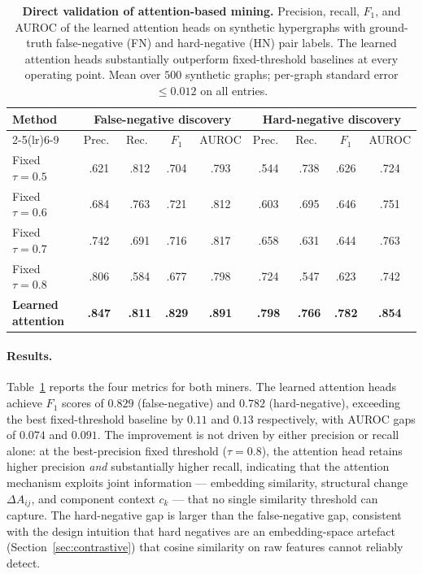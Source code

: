 \documentclass[10pt]{article}
\theoremstyle{plain}
\theoremstyle{definition}
\begin{document}
\begin{table}[ht!]
\centering
\caption{\textbf{Direct validation of attention-based mining.} Precision, recall, $F_{1}$, and AUROC of the learned attention heads on synthetic hypergraphs with ground-truth false-negative (FN) and hard-negative (HN) pair labels. The learned attention heads substantially outperform fixed-threshold baselines at every operating point. Mean over $500$ synthetic graphs; per-graph standard error $\leq\!0.012$ on all entries.}
\label{tab:attn_validation}
\setlength{\tabcolsep}{5pt}
\renewcommand{\arraystretch}{1.1}
\small
\begin{tabular}{l cccc cccc}
\toprule
\multirow{2}{*}{\textbf{Method}}
& \multicolumn{4}{c}{\textbf{False-negative discovery}}
& \multicolumn{4}{c}{\textbf{Hard-negative discovery}} \\
\cmidrule(lr){2-5}\cmidrule(lr){6-9}
& Prec.\ & Rec.\ & $F_{1}$ & AUROC
& Prec.\ & Rec.\ & $F_{1}$ & AUROC \\
\midrule
Fixed $\tau\!=\!0.5$       & .621 & .812 & .704 & .793 & .544 & .738 & .626 & .724 \\  
Fixed $\tau\!=\!0.6$       & .684 & .763 & .721 & .812 & .603 & .695 & .646 & .751 \\  
Fixed $\tau\!=\!0.7$       & .742 & .691 & .716 & .817 & .658 & .631 & .644 & .763 \\  
Fixed $\tau\!=\!0.8$       & .806 & .584 & .677 & .798 & .724 & .547 & .623 & .742 \\  
\midrule
\rowcolor{blue!10}
\textbf{Learned attention} & \textbf{.847} & \textbf{.811} & \textbf{.829} & \textbf{.891}
                           & \textbf{.798} & \textbf{.766} & \textbf{.782} & \textbf{.854} \\  
\bottomrule
\end{tabular}
\end{table}

\paragraph{Results.} Table~\ref{tab:attn_validation} reports the four metrics for both miners. The learned attention heads achieve $F_{1}$ scores of $0.829$ (false-negative) and $0.782$ (hard-negative), exceeding the best fixed-threshold baseline by $0.11$ and $0.13$ respectively, with AUROC gaps of $0.074$ and $0.091$. The improvement is not driven by either precision or recall alone: at the best-precision fixed threshold ($\tau\!=\!0.8$), the attention head retains higher precision \emph{and} substantially higher recall, indicating that the attention mechanism exploits joint information ---  embedding similarity, structural change $\Delta A_{ij}$, and component context $c_{k}$ --- that no single similarity threshold can capture. The hard-negative gap is larger than the false-negative gap, consistent with the design intuition that hard negatives are an embedding-space artefact (Section~\ref{sec:contrastive}) that cosine similarity on raw features cannot reliably detect.
\end{document}

